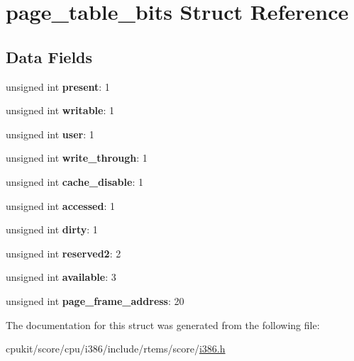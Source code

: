 \hypertarget{structpage__table__bits}{}\section{page\+\_\+table\+\_\+bits Struct Reference}
\label{structpage__table__bits}
\subsection*{Data Fields}
\begin{DoxyCompactItemize}
\item 
\mbox{\label{structpage__table__bits_a2d2053177c8642e5e380e31e9dd5fc1f}} 
unsigned int {\bfseries present}\+: 1
\item 
\mbox{\label{structpage__table__bits_ab0dbf5b452a007a4d09830a18c83d428}} 
unsigned int {\bfseries writable}\+: 1
\item 
\mbox{\label{structpage__table__bits_a2f47b6116552f34a33c97e7ffe21ccd3}} 
unsigned int {\bfseries user}\+: 1
\item 
\mbox{\label{structpage__table__bits_a0e4690d84956a18e15ce8edbb21e8833}} 
unsigned int {\bfseries write\+\_\+through}\+: 1
\item 
\mbox{\label{structpage__table__bits_a59dd905a633f0ecaba0223a5990ff721}} 
unsigned int {\bfseries cache\+\_\+disable}\+: 1
\item 
\mbox{\label{structpage__table__bits_ac410d672c4130b93c633b8be48518219}} 
unsigned int {\bfseries accessed}\+: 1
\item 
\mbox{\label{structpage__table__bits_a1313d9cdafe50928262c155564cde05f}} 
unsigned int {\bfseries dirty}\+: 1
\item 
\mbox{\label{structpage__table__bits_a9c3a28379aadb1b007851e5937ad78b0}} 
unsigned int {\bfseries reserved2}\+: 2
\item 
\mbox{\label{structpage__table__bits_a991d505957102280a6bc5f12f36e9aed}} 
unsigned int {\bfseries available}\+: 3
\item 
\mbox{\label{structpage__table__bits_a9662354b76dcf795ab7cfed74725fa09}} 
unsigned int {\bfseries page\+\_\+frame\+\_\+address}\+: 20
\end{DoxyCompactItemize}


The documentation for this struct was generated from the following file\+:\begin{DoxyCompactItemize}
\item 
cpukit/score/cpu/i386/include/rtems/score/\mbox{\hyperlink{i386_8h}{i386.\+h}}\end{DoxyCompactItemize}
